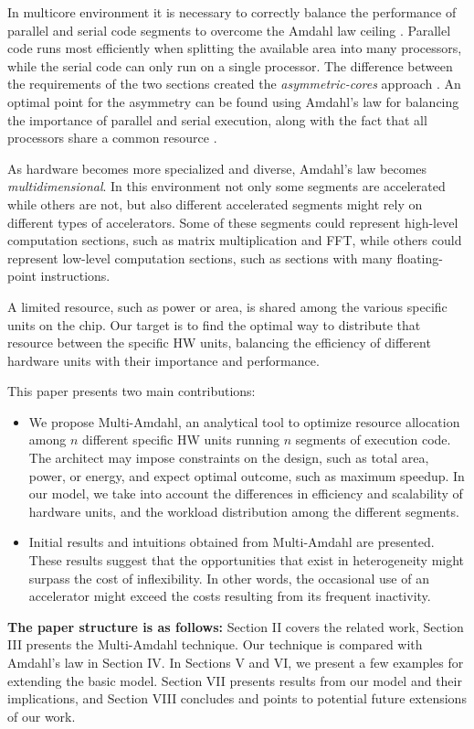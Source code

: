 \documentclass[twocolumn,english]{IEEEtran}
\begin{document}
In multicore environment it is necessary to correctly balance the
performance of parallel and serial code segments to overcome the Amdahl
law ceiling \cite{AmdahlsLaw}. Parallel code runs most efficiently
when splitting the available area into many processors, while the
serial code can only run on a single processor. The difference between
the requirements of the two sections created the \textit{asymmetric-cores}
approach \cite{ACCMP-Asymme}. An optimal point for the asymmetry
can be found using Amdahl's law for balancing the importance of parallel
and serial execution, along with the fact that all processors share
a common resource \cite{hill2008amdahl}. 

As hardware becomes more specialized and diverse, Amdahl's law becomes
\textit{multidimensional}. In this environment not only some segments
are accelerated while others are not, but also different accelerated
segments might rely on different types of accelerators. Some of these
segments could represent high-level computation sections, such as
matrix multiplication and FFT, while others could represent low-level
computation sections, such as sections with many floating-point instructions.

A limited resource, such as power or area, is shared among the various
specific units on the chip. Our target is to find the optimal way
to distribute that resource between the specific HW units, balancing
the efficiency of different hardware units with their importance and
performance.

This paper presents two main contributions: 
\begin{itemize}
\item We propose Multi-Amdahl, an analytical tool to optimize resource allocation
among $n$ different specific HW units running $n$ segments of execution
code. The architect may impose constraints on the design, such as
total area, power, or energy, and expect optimal outcome, such as
maximum speedup. In our model, we take into account the differences
in efficiency and scalability of hardware units, and the workload
distribution among the different segments. 
\item Initial results and intuitions obtained from Multi-Amdahl are presented.
These results suggest that the opportunities that exist in heterogeneity
might surpass the cost of inflexibility. In other words, the occasional
use of an accelerator might exceed the costs resulting from its frequent
inactivity.
\end{itemize}
\textbf{The paper structure is as follows:} Section II covers the
related work, Section III presents the Multi-Amdahl technique. Our
technique is compared with Amdahl's law in Section IV. In Sections
V and VI, we present a few examples for extending the basic model.
Section VII presents results from our model and their implications,
and Section VIII concludes and points to potential future extensions
of our work.
\end{document}
